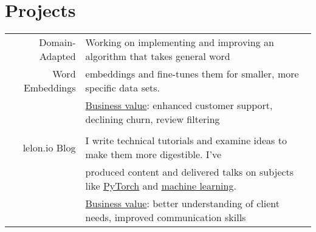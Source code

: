 \documentclass[a4paper,10pt]{article}
\begin{document}
	\section{Projects}
	\begin{tabular}{rl}	
		Domain-Adapted  & Working on implementing and improving an algorithm that takes general word  \\
		
		Word Embeddings & embeddings and fine-tunes them for smaller, more specific data sets. \\ 
		
		& \underline{Business value}: enhanced customer support, declining churn, review filtering \\
		
		& \\
		
		lelon.io Blog  & I write technical tutorials and examine ideas to make them more digestible. I've \\
		
		& produced content and delivered talks on subjects like \href {https://lelon.io/blog/2018/02/08/pytorch-with-baby-steps}{PyTorch} and \href {https://lelon.io/project/intro-to-pytorch-an-evening-of-python-coding-meetup-demo/}{machine learning}. \\ 
		
		& \underline{Business value}: better understanding of client needs, improved communication skills \\
		
	\end{tabular}
\end{document}
